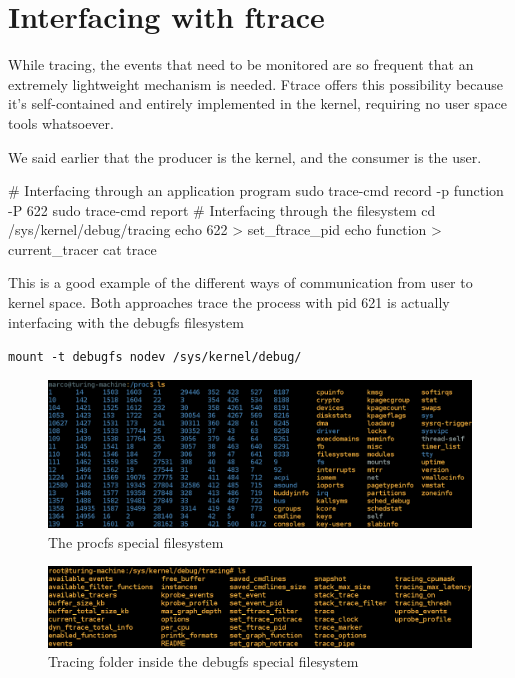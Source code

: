 \documentclass[10pt]{book}
\begin{document}
\section{Interfacing with ftrace}
While tracing, the events that need to be monitored are so frequent that an extremely lightweight mechanism is needed. Ftrace offers this possibility because it's self-contained and entirely implemented in the kernel, requiring no user space tools whatsoever.

We said earlier that the producer is the kernel, and the consumer is the user.


\begin{codebash}
# Interfacing through an application program
sudo trace-cmd record -p function -P 622
sudo trace-cmd report
# Interfacing through the filesystem
cd /sys/kernel/debug/tracing
echo 622 > set_ftrace_pid
echo function > current_tracer
cat trace
\end{codebash}
This is a good example of the different ways of communication from user to kernel space. Both approaches trace the process with pid 621
is actually interfacing with the debugfs filesystem

\verb|mount -t debugfs nodev /sys/kernel/debug/|
\begin{figure}[ht]
\includegraphics[width=\textwidth]{images/shell_proc.png} 
\caption{The procfs special filesystem}
\label{img:proc}
\end{figure}

\begin{figure}[ht]
\includegraphics[width=\textwidth]{images/shell_tracing.png} 
\caption{Tracing folder inside the debugfs special filesystem}
\label{img:tracing}
\end{figure}
\end{document}
